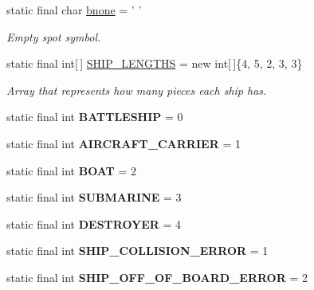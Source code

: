 \begin{DoxyCompactItemize}
static final char \hyperlink{classbattleShip_1_1Board_ae9d384309243340b7daf402ab99175df}{bnone} = ' '
\begin{DoxyCompactList}\small\item\em Empty spot symbol. \end{DoxyCompactList}\item 
static final int\mbox{[}$\,$\mbox{]} \hyperlink{classbattleShip_1_1Board_acc89eea78f07c10949b4c93b5fb14503}{S\-H\-I\-P\-\_\-\-L\-E\-N\-G\-T\-H\-S} = new int\mbox{[}$\,$\mbox{]}\{4, 5, 2, 3, 3\}
\begin{DoxyCompactList}\small\item\em Array that represents how many pieces each ship has. \end{DoxyCompactList}\item 
\hypertarget{classbattleShip_1_1Board_a705ebad65889b48bd3bf380c71eda867}{static final int {\bfseries B\-A\-T\-T\-L\-E\-S\-H\-I\-P} = 0}\label{classbattleShip_1_1Board_a705ebad65889b48bd3bf380c71eda867}

\item 
\hypertarget{classbattleShip_1_1Board_a330ba82967aa6f646117eb23c145da14}{static final int {\bfseries A\-I\-R\-C\-R\-A\-F\-T\-\_\-\-C\-A\-R\-R\-I\-E\-R} = 1}\label{classbattleShip_1_1Board_a330ba82967aa6f646117eb23c145da14}

\item 
\hypertarget{classbattleShip_1_1Board_a773c153a91ebae98080a11124ea119b1}{static final int {\bfseries B\-O\-A\-T} = 2}\label{classbattleShip_1_1Board_a773c153a91ebae98080a11124ea119b1}

\item 
\hypertarget{classbattleShip_1_1Board_af401e7c0785ccc50d283688cc4545228}{static final int {\bfseries S\-U\-B\-M\-A\-R\-I\-N\-E} = 3}\label{classbattleShip_1_1Board_af401e7c0785ccc50d283688cc4545228}

\item 
\hypertarget{classbattleShip_1_1Board_a4f2e9c31a8afab6a91986fa3615e3550}{static final int {\bfseries D\-E\-S\-T\-R\-O\-Y\-E\-R} = 4}\label{classbattleShip_1_1Board_a4f2e9c31a8afab6a91986fa3615e3550}

\item 
\hypertarget{classbattleShip_1_1Board_a4c732a22f6cc05fc1bf327c3ba868aa1}{static final int {\bfseries S\-H\-I\-P\-\_\-\-C\-O\-L\-L\-I\-S\-I\-O\-N\-\_\-\-E\-R\-R\-O\-R} = 1}\label{classbattleShip_1_1Board_a4c732a22f6cc05fc1bf327c3ba868aa1}

\item 
\hypertarget{classbattleShip_1_1Board_ad992fde1451779831ae9b654e1f158d0}{static final int {\bfseries S\-H\-I\-P\-\_\-\-O\-F\-F\-\_\-\-O\-F\-\_\-\-B\-O\-A\-R\-D\-\_\-\-E\-R\-R\-O\-R} = 2}\label{classbattleShip_1_1Board_ad992fde1451779831ae9b654e1f158d0}

\end{DoxyCompactItemize}



